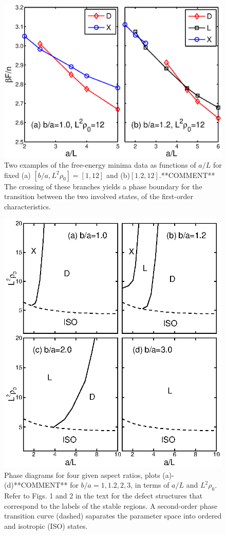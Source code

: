 \documentclass[pre,twocolumn,preprintnumbers,reprint]{revtex4}
\begin{document}
\begin{figure}[!t]
\includegraphics[width = 1.1 \columnwidth]{eps/energy-plot.eps}
\caption{Two examples of the free-energy minima data as functions of $a/L$ for fixed (a) $[b/a, L^2\rho_0]= [1,12]$ and (b)$ [1.2, 12]$.**COMMENT** The crossing of these branches yields a phase boundary for the transition between the two involved states, of the first-order characteristics. } \label{P2}
\end{figure}

\begin{figure}[!t]
\includegraphics[width = 0.85 \columnwidth]{eps/ABCD.eps}
\caption{Phase diagrams for four given aspect ratios, plots (a)-(d)**COMMENT** for $b/a=1, 1.2, 2, 3$, in terms of $a/L$ and $L^2\rho_0$. Refer to Figs. 1 and 2 in the text for the defect structures that correspond to the labels of the stable regions. A second-order phase transition curve (dashed) saparates the parameter space into ordered and isotropic (ISO) states.} \label{phase}
\end{figure}
\end{document}
